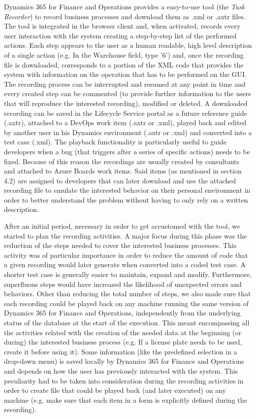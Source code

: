 Dynamics 365 for Finance and Operations provides a easy-to-use tool (the \textit{Task Recorder}) to record business processes and download them as .xml or .axtr files. The tool is integrated in the browser client and, when activated, records every user interaction with the system creating a step-by-step list of the performed actions. Each step appears to the user as a human readable, high level description of a single action (e.g. In the Warehouse field, type '6') and, once the recording file is downloaded, corresponds to a portion of the XML code that provides the system with information on the operation that has to be performed on the GUI. The recording process can be interrupted and resumed at any point in time and every created step can be commented (to provide further information to the users that will reproduce the interested recording), modified or deleted. A downloaded recording can be saved in the Lifecycle Service portal as a future reference guide (.axtr), attached to a DevOps work item (.axtr or .xml), played back and edited by another user in his Dynamics environment (.axtr or .xml) and converted into a test case (.xml). The playback functionality is particularly useful to guide developers when a bug (that triggers after a series of specific actions) needs to be fixed. Because of this reason the recordings are usually created by consultants and attached to Azure Boards work items. Said items (as mentioned in section 4.2) are assigned to developers that can later download and use the attached recording file to emulate the interested behavior on their personal environment in order to better understand the problem without having to only rely on a written description.

After an initial period, necessary in order to get accustomed with the tool, we started to plan the recording activities. A major focus during this phase was the reduction of the steps needed to cover the interested business processes. This activity was of particular importance in order to reduce the amount of code that a given recording would later generate when converted into a coded test case. A shorter test case is generally easier to maintain, expand and modify. Furthermore, superfluous steps would have increased the likelihood of unexpected errors and behaviors. Other than reducing the total number of steps, we also made sure that each recording could be played back on any machine running the same version of Dynamics 365 for Finance and Operations, independently from the underlying status of the database at the start of the execution. This meant encompassing all the activities related with the creation of the needed data at the beginning (or during) the interested business process (e.g. If a license plate needs to be used, create it before using it). Some information (like the predefined selection in a drop-down menu) is saved locally by Dynamics 365 for Finance and Operations and depends on how the user has previously interacted with the system. This peculiarity had to be taken into consideration during the recording activities in order to create file that could be played back (and later executed) on any machine (e.g. make sure that each item in a form is explicitly defined during the recording). 

